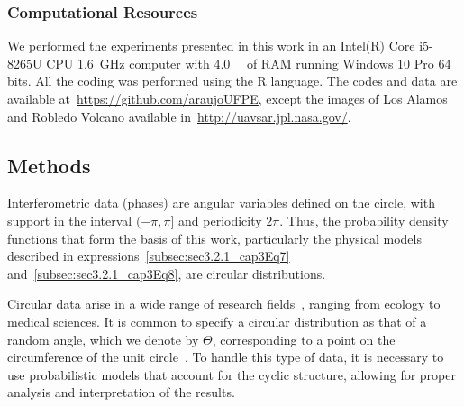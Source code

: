 \documentclass[remotesensing,article,submit,pdftex,moreauthors]{Definitions/mdpi}
\begin{document}
\subsubsection{Computational Resources}\label{subsec:Computational_Resources}

We performed the experiments presented in this work in an Intel(R) Core i5-8265U CPU  \qty{1.6}{\giga\hertz} computer with \qty{4.0}{\giga\byte} of RAM running Windows 10 Pro 64 bits. 
All the coding was performed using the R language. 
The codes and data are available at~\url{https://github.com/araujoUFPE}, except the images of Los Alamos and Robledo Volcano available in~\url{http://uavsar.jpl.nasa.gov/}.

\subsection{Methods}\label{subsec:methods}

Interferometric data (phases) are angular variables defined on the circle, with support in the interval $(-\pi, \pi]$ and periodicity $2\pi$. 
Thus, the probability density functions that form the basis of this work, particularly the physical models described in expressions~\eqref{subsec:sec3.2.1_cap3Eq7} and~\eqref{subsec:sec3.2.1_cap3Eq8}, are circular distributions. 


Circular data arise in a wide range of research fields~\cite{OneDirection?ATutorialforCircularDataAnalysisUsingRWithExamplesinCognitivePsychology}, ranging from ecology to medical sciences. 
It is common to specify a circular distribution as that of a random angle, which we denote by $\Theta$, corresponding to a point on the circumference of the unit circle~\cite{CircularStatisticsinR}. 
To handle this type of data, it is necessary to use probabilistic models that account for the cyclic structure, allowing for proper analysis and interpretation of the results.
\end{document}
